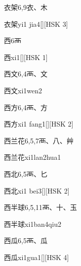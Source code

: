 \begin{entry}{衣架}{6,9}{⾐、⽊}
  \begin{phonetics}{衣架}{yi1 jia4}[][HSK 3]
  \end{phonetics}
\end{entry}

\begin{entry}{西}{6}{⾑}
  \begin{phonetics}{西}{xi1}[][HSK 1]
  \end{phonetics}
\end{entry}

\begin{entry}{西文}{6,4}{⾑、⽂}
  \begin{phonetics}{西文}{xi1wen2}
  \end{phonetics}
\end{entry}

\begin{entry}{西方}{6,4}{⾑、⽅}
  \begin{phonetics}{西方}{xi1 fang1}[][HSK 2]
  \end{phonetics}
\end{entry}

\begin{entry}{西兰花}{6,5,7}{⾑、⼋、⾋}
  \begin{phonetics}{西兰花}{xi1lan2hua1}
  \end{phonetics}
\end{entry}

\begin{entry}{西北}{6,5}{⾑、⼔}
  \begin{phonetics}{西北}{xi1 bei3}[][HSK 2]
  \end{phonetics}
\end{entry}

\begin{entry}{西半球}{6,5,11}{⾑、⼗、⽟}
  \begin{phonetics}{西半球}{xi1ban4qiu2}
  \end{phonetics}
\end{entry}

\begin{entry}{西瓜}{6,5}{⾑、⽠}
  \begin{phonetics}{西瓜}{xi1gua1}[][HSK 4]
  \end{phonetics}
\end{entry}


